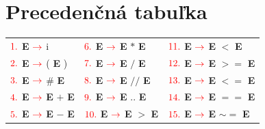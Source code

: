 \documentclass[a4paper, 11pt]{article}
\newcommand{\arrow} {$\color{red} \rightarrow$\space}
\begin{document}
    \section*{Precedenčná tabuľka}
    \label{sec: prec-tabulka}
    \newcommand{\bE}{\textbf{E}}
    \begin{table}[!htbp]
        \centering
        \begin{tabular}{l@{\hskip 1in} l@{\hskip 1in} l}
            $\color{red} 1.$ \bE{} \space\arrow{} i               & $\color{red} 6.$  \bE{} \space\arrow{} \bE{} $*$ \bE{}  & $\color{red} 11.$ \bE{} \space\arrow{} \bE{} $<$ \bE{}     \\
            $\color{red} 2.$ \bE{} \space\arrow{} ( \bE{} )         & $\color{red} 7.$  \bE{} \space\arrow{} \bE{} $/$ \bE{}  & $\color{red} 12.$ \bE{} \space\arrow{} \bE{} $>=$ \bE{}    \\
            $\color{red} 3.$ \bE{} \space\arrow{} \# \bE{}         & $\color{red} 8.$  \bE{} \space\arrow{} \bE{} $//$ \bE{} & $\color{red} 13.$ \bE{} \space\arrow{} \bE{} $<=$ \bE{}    \\
            $\color{red} 4.$ \bE{} \space\arrow{} \bE{} $+$ \bE{} & $\color{red} 9.$  \bE{} \space\arrow{} \bE{} .. \bE{}   & $\color{red} 14.$ \bE{} \space\arrow{} \bE{} $==$ \bE{}    \\
            $\color{red} 5.$ \bE{} \space\arrow{} \bE{} $-$ \bE{} & $\color{red} 10.$ \bE{} \space\arrow{} \bE{} $>$ \bE{}  & $\color{red} 15.$ \bE{} \space\arrow{} \bE{} $\sim=$ \bE{} \\
        \end{tabular}
    \end{table}
\end{document}
